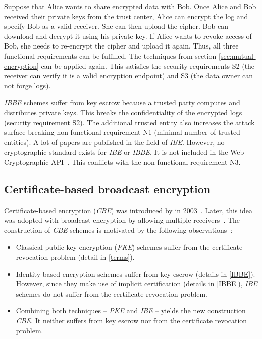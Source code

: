 \documentclass[../main.tex]{subfiles}
\begin{document}
Suppose that Alice wants to share encrypted data with Bob.
Once Alice and Bob received their private keys from the trust center, Alice can encrypt the log and specify Bob as a valid receiver.
She can then upload the cipher.
Bob can download and decrypt it using his private key.
If Alice wants to revoke access of Bob, she needs to re-encrypt the cipher and upload it again.
Thus, all three functional requirements can be fulfilled.
The techniques from section \ref{sec:mutual-encryption} can be applied again.
This satisfies the security requirements S2 (the receiver can verify it is a valid encryption endpoint) and S3 (the data owner can not forge logs).

\textit{IBBE} schemes suffer from key escrow because a trusted party computes and distributes private keys.
This breaks the confidentiality of the encrypted logs (security requirement S2).
The additional trusted entity also increases the attack surface breaking non-functional requirement N1 (minimal number of trusted entities).
A lot of papers are published in the field of \textit{IBE}.
However, no cryptographic standard exists for \textit{IBE} or \textit{IBBE}.
It is not included in the Web Cryptographic API~\cite{WebCryptoApi2017}.
This conflicts with the non-functional requirement N3.

\subsection{Certificate-based broadcast encryption}
\label{sec:broadcast-certificate}

Certificate-based encryption (\textit{CBE}) was introduced by \citeauthor{Gentry2003} in 2003~\cite{Gentry2003}. 
Later, this idea was adopted with broadcast encryption by allowing multiple receivers~\cite{Li2018, Fan2013}.
The construction of \textit{CBE} schemes is motivated by the following observations~\cite{Gentry2003}:

\begin{itemize}
    \item Classical public key encryption (\textit{PKE}) schemes suffer from the certificate revocation problem (detail in \cref{terms}).
    \item Identity-based encryption schemes suffer from key escrow (details in \cref{IBBE}).
    However, since they make use of implicit certification (details in \cref{IBBE}), \textit{IBE} schemes do not suffer from the certificate revocation problem.
    \item Combining both techniques -- \textit{PKE} and \textit{IBE} -- yields the new construction \textit{CBE}. 
    It neither suffers from key escrow nor from the certificate revocation problem.
\end{itemize}
\end{document}

